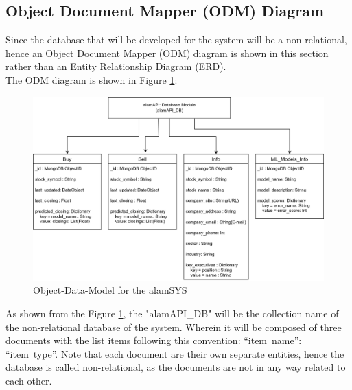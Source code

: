 \subsection{Object Document Mapper (ODM) Diagram}
\label{subsec:odm_subsec}
Since the database that will be developed for the system will be 
a non-relational, hence an Object Document Mapper (ODM) 
diagram is shown in this section rather than an Entity Relationship Diagram (ERD).
\hfill \\

The ODM diagram is shown in Figure \ref{fig:odm}:
\begin{figure}[ht]
    \centering
    \includegraphics[width=1\textwidth]{./assets/ODM.png}
    \caption{Object-Data-Model for the alamSYS}
    \label{fig:odm}
\end{figure}
\FloatBarrier
As shown from the Figure \ref{fig:odm}, the "alamAPI\_DB" will be the collection
name of the non-relational database of the system. Wherein it 
will be composed of three documents with the list items following this convention: 
“item\ name”: “item\ type”. 
Note that each document are their own separate entities, 
hence the database is called non-relational, as the documents are not in 
any way related to each other.
\hfill \\

